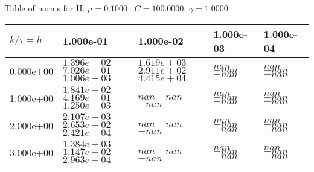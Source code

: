 \begin{center}
Table of norms for H. $\mu = 0.1000$ \, $C = 100.0000$, $\gamma = 1.0000$
  
\begin{tabular}{|p{1in}|p{1in}|p{1in}|p{1in}|p{1in}|} \hline
$k / \tau = h$ &1.000e-01 &1.000e-02 &1.000e-03 &1.000e-04 \\ \hline 
0.000e+00 & $1.396e+02$  $7.026e+01$  $1.006e+03$  & $1.619e+03$  $2.911e+02$  $4.415e+04$  & $nan$  $-nan$  $-nan$  & $nan$  $-nan$  $-nan$  \\ \hline 
1.000e+00 & $1.841e+02$  $4.169e+01$  $1.250e+03$  & $nan$  $-nan$  $-nan$  & $nan$  $-nan$  $-nan$  & $nan$  $-nan$  $-nan$  \\ \hline 
2.000e+00 & $2.107e+03$  $2.653e+02$  $2.421e+04$  & $nan$  $-nan$  $-nan$  & $nan$  $-nan$  $-nan$  & $nan$  $-nan$  $-nan$  \\ \hline 
3.000e+00 & $1.384e+03$  $1.147e+02$  $2.963e+04$  & $nan$  $-nan$  $-nan$  & $nan$  $-nan$  $-nan$  & $nan$  $-nan$  $-nan$  \\ \hline 

\end{tabular}\\[20pt]
\end{center}

